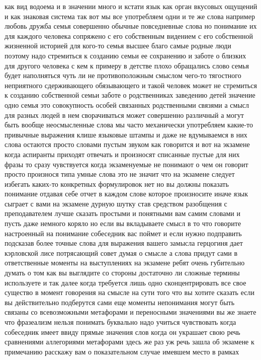 как вид водоема и в значении много и кстати язык как орган вкусовых ощущений и
как знаковая система так вот мы все употребляем одни и те же слова например
любовь дружба семья совершенно обычные повседневные слова но понимание их для
каждого человека сопряжено с его собственным видением с его собственной
жизненной историей для кого-то семья высшее благо самые родные люди поэтому надо
стремиться к созданию семьи ее сохранению и заботе о близких для другого
человека с кем к примеру в детстве плохо обращались слово семья будет
наполняться чуть ли не противоположным смыслом чего-то тягостного неприятного
сдерживающего обязывающего и такой человек может не стремиться к созданию
собственной семьи заботе о родственниках заведению детей значение одно семья это
совокупность особей связанных родственными связями а смысл для разных людей в
нем сворачиваться может совершенно различный а могут быть вообще неосмысленные
слова мы часто механически употребляем какие-то привычные выражения клише
языковые штампы и даже не вдумываемся в них слова остаются просто словами пустым
звуком как говорится и вот на экзамене когда аспиранты приходят отвечать и
произносят списанные пустые для них фразы то сразу чувствуется когда
экзаменуемые не понимают о чем он говорит просто произнося типа умные слова это
не значит что на экзамене следует избегать каких-то конкретных формулировок нет
но вы должны показать понимание отдавая себе отчет в каждом слове которое
произносите иначе язык сыграет с вами на экзамене дурную шутку став средством
разобщения с преподавателем лучше сказать простыми и понятными вам самим словами
и пусть даже немного коряло но если вы вкладываете смысл в то что говорите
настроенный на понимание собеседник вас поймет и если нужно подправить подсказав
более точные слова для выражения вашего замысла герцогиня дает кэрловской лисе
потрясающий совет думая о смысле а слова придут сами в ответственные моменты на
выступлениях на экзамене ребят очень губительно думать о том как вы выглядите со
стороны достаточно ли сложные термины используете и так далее когда требуется
лишь одно сконцентрировать все свое существо в момент говорения на смысле на
сути того что вы хотите сказать если вы действительно подберутся сами еще
моменты непонимания могут быть связаны со всевозможными метафорами и переносными
значениями вы же знаете что фразеализм нельзя понимать буквально надо учиться
чувствовать когда собеседник имеет ввиду прямые значения слов когда он украшает
свою речь сравнениями аллегориями метафорами здесь же раз уж речь зашла об
экзамене к примечанию расскажу вам о показательном случае имевшем место в рамках
